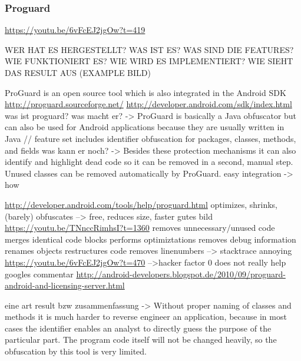 \subsubsection{Proguard} \label{subsubsection:counter-reengineering-optobf-proguard}

\url{https://youtu.be/6vFcEJ2jgOw?t=419}\newline

WER HAT ES HERGESTELLT? WAS IST ES? WAS SIND DIE FEATURES? WIE FUNKTIONIERT ES? WIE WIRD ES IMPLEMENTIERT? WIE SIEHT DAS RESULT AUS (EXAMPLE BILD)\newline

ProGuard is an open source tool which is also integrated in the Android SDK
\url{http://proguard.sourceforge.net/}
\url{http://developer.android.com/sdk/index.html}\newline
was ist proguard? was macht er? -> ProGuard is basically a Java obfuscator but can also be used for Android applications because they are usually written in Java // feature set includes identifier obfuscation for packages, classes, methods, and fields\newline
was kann er noch? -> Besides these protection mechanisms it can also identify and highlight dead code so it can be removed in a second, manual step. Unused classes can be removed automatically by ProGuard.\newline
easy integration -> how\newline

\url{http://developer.android.com/tools/help/proguard.html}\newline
optimizes, shrinks, (barely) obfuscates --> free, reduces size, faster\newline
gutes bild \url{https://youtu.be/TNnccRimhsI?t=1360}\newline
removes unnecessary/unused code\newline
merges identical code blocks\newline
performs optimiztations\newline
removes debug information\newline
renames objects\newline
restructures code\newline
removes linenumbers --> stacktrace annoying\newline
\url{https://youtu.be/6vFcEJ2jgOw?t=470}\newline
-->hacker factor 0\newline
does not really help\newline
googles commentar \url{http://android-developers.blogspot.de/2010/09/proguard-android-and-licensing-server.html}\newline

eine art result bzw zusammenfassung -> Without proper naming of classes and methods it is much harder to reverse engineer an application, because in most cases the identifier enables an analyst to directly guess the purpose of the particular part. The program code itself will not be changed heavily, so the obfuscation by this tool is very limited.
